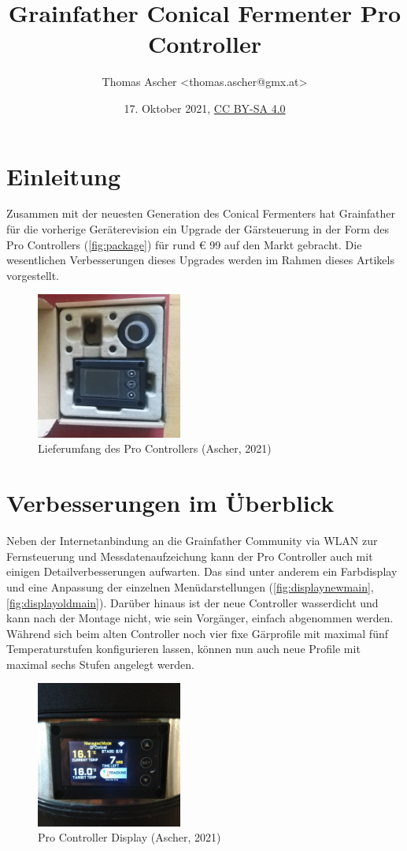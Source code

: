 \documentclass[a4paper,parskip=half]{scrartcl}
\title{Grainfather Conical Fermenter Pro Controller}
\author{Thomas Ascher <thomas.ascher@gmx.at>}
\date{17. Oktober 2021, \href{http://creativecommons.org/licenses/by-sa/4.0/}{CC BY-SA 4.0}}
\begin{document}
\maketitle

\section*{Einleitung}

Zusammen mit der neuesten Generation des Conical Fermenters
hat Grainfather für die vorherige Geräterevision ein Upgrade
der Gärsteuerung in der Form des Pro Controllers (\autoref{fig:package}) für
rund € 99 auf den Markt gebracht.
Die wesentlichen Verbesserungen dieses Upgrades werden im Rahmen
dieses Artikels vorgestellt. 
 
\begin{figure}[h]
\centering
\includegraphics[width=4.8cm]{images/gfpc_package.jpg}
\caption{Lieferumfang des Pro Controllers (Ascher, 2021)}
\label{fig:package}
\end{figure}

\section*{Verbesserungen im Überblick}

Neben der Internetanbindung an die Grainfather Community
via WLAN zur Fernsteuerung und Messdatenaufzeichung kann der
Pro Controller auch mit einigen Detailverbesserungen aufwarten.
Das sind unter anderem ein Farbdisplay und eine Anpassung
der einzelnen Menüdarstellungen (\autoref{fig:displaynewmain},
\autoref{fig:displayoldmain}). Darüber hinaus ist der neue
Controller wasserdicht und kann nach der Montage nicht,
wie sein Vorgänger, einfach abgenommen werden.
Während sich beim alten Controller noch vier fixe Gärprofile mit
maximal fünf Temperaturstufen konfigurieren lassen, können nun
auch neue Profile mit maximal sechs Stufen angelegt werden.

\begin{figure}[H]
\centering
\includegraphics[width=4.8cm]{images/gfpc_display_new_main.jpg}
\caption{Pro Controller Display (Ascher, 2021)}
\label{fig:displaynewmain}
\end{figure}
\end{document}
